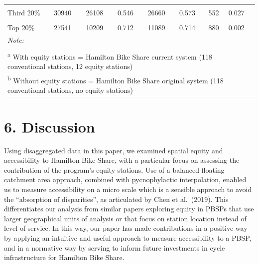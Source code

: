 \documentclass[]{elsarticle} %
\begin{document}
\begin{table}
{\begin{tabular}[t]{lccccccl}
\hspace{1em}\cellcolor{gray!6}{Second 20\%} & \cellcolor{gray!6}{33312} & \cellcolor{gray!6}{30507} & \cellcolor{gray!6}{0.551} & \cellcolor{gray!6}{31069} & \cellcolor{gray!6}{0.611} & \cellcolor{gray!6}{562} & \cellcolor{gray!6}{0.060}\\
\hspace{1em}Third 20\% & 30940 & 26108 & 0.546 & 26660 & 0.573 & 552 & 0.027\\
\hspace{1em}\cellcolor{gray!6}{Fourth 20\%} & \cellcolor{gray!6}{20185} & \cellcolor{gray!6}{6312} & \cellcolor{gray!6}{0.093} & \cellcolor{gray!6}{7435} & \cellcolor{gray!6}{0.096} & \cellcolor{gray!6}{1123} & \cellcolor{gray!6}{0.003}\\
\hspace{1em}Top 20\% & 27541 & 10209 & 0.712 & 11089 & 0.714 & 880 & 0.002\\
\bottomrule
\multicolumn{8}{l}{\rule{0pt}{1em}\textit{Note: }}\\
\multicolumn{8}{l}{\rule{0pt}{1em} }\\
\multicolumn{8}{l}{\rule{0pt}{1em}\textsuperscript{a} With equity stations = Hamilton Bike Share current system (118 conventional stations, 12 equity stations)}\\
\multicolumn{8}{l}{\rule{0pt}{1em}\textsuperscript{b} Without equity stations = Hamilton Bike Share original system (118 conventional stations, no equity stations)}\\
\end{tabular}}
\end{table}

\hypertarget{discussion}{%
\section{6. Discussion}\label{discussion}}

Using disaggregated data in this paper, we examined spatial equity and
accessibility to Hamilton Bike Share, with a particular focus on
assessing the contribution of the program's equity stations. Use of a
balanced floating catchment area approach, combined with pycnophylactic
interpolation, enabled us to measure accessibility on a micro scale
which is a sensible approach to avoid the ``absorption of disparities'',
as articulated by Chen et al.~(2019). This differentiates our analysis
from similar papers exploring equity in PBSPs that use larger
geographical units of analysis or that focus on station location instead
of level of service. In this way, our paper has made contributions in a
positive way by applying an intuitive and useful approach to measure
accessibility to a PBSP, and in a normative way by serving to inform
future investments in cycle infrastructure for Hamilton Bike Share.
\end{document}
